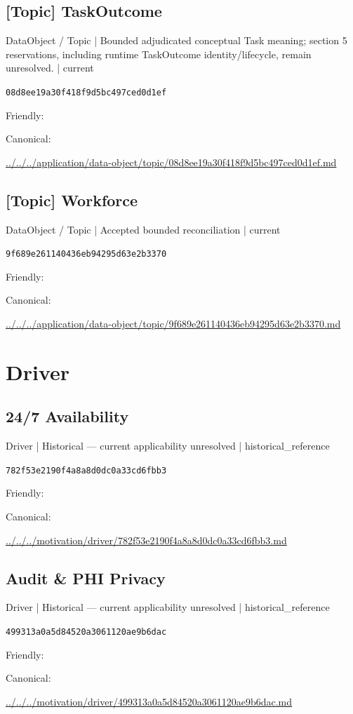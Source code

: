 \documentclass[10pt,a4paper]{article}
\begin{document}
\subsection*{[Topic] TaskOutcome}
{\small DataObject / Topic | Bounded adjudicated conceptual Task meaning; section 5 reservations, including runtime TaskOutcome identity/lifecycle, remain unresolved. | current}\par
\texttt{08d8ee19a30f418f9d5bc497ced0d1ef}\par
Friendly: \par
Canonical: \par
{\footnotesize\url{../../../application/data-object/topic/08d8ee19a30f418f9d5bc497ced0d1ef.md}}\par
\subsection*{[Topic] Workforce}
{\small DataObject / Topic | Accepted bounded reconciliation | current}\par
\texttt{9f689e261140436eb94295d63e2b3370}\par
Friendly: \par
Canonical: \par
{\footnotesize\url{../../../application/data-object/topic/9f689e261140436eb94295d63e2b3370.md}}\par
\section*{Driver}
\subsection*{24/7 Availability}
{\small Driver | Historical — current applicability unresolved | historical\_reference}\par
\texttt{782f53e2190f4a8a8d0dc0a33cd6fbb3}\par
Friendly: \par
Canonical: \par
{\footnotesize\url{../../../motivation/driver/782f53e2190f4a8a8d0dc0a33cd6fbb3.md}}\par
\subsection*{Audit \& PHI Privacy}
{\small Driver | Historical — current applicability unresolved | historical\_reference}\par
\texttt{499313a0a5d84520a3061120ae9b6dac}\par
Friendly: \par
Canonical: \par
{\footnotesize\url{../../../motivation/driver/499313a0a5d84520a3061120ae9b6dac.md}}\par
\end{document}

